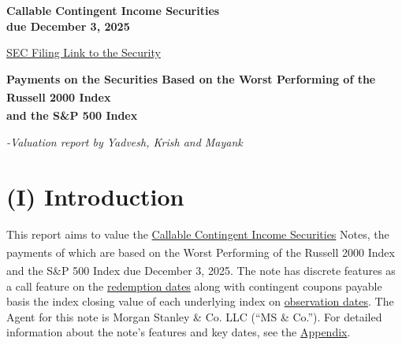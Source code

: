 \documentclass[12pt,a4paper]{article}
\begin{document}
\begin{center}
{\color{americanblue}\Large\textbf{Callable Contingent Income Securities \\ due December 3, 2025}}

\vspace{0.2cm}
{\color{americanblue}\large\href{https://sec.gov/Archives/edgar/data/1666268/000183988223032004/ms75\_424b2-16958.htm}{SEC Filing Link to the Security}}

\vspace{0.2cm}
{\color{americanblue}\Large\textbf{Payments on the Securities Based on the Worst Performing of the Russell 2000\textsuperscript{\textregistered} Index\\and the S\&P 500\textsuperscript{\textregistered} Index}}

\vspace{0.2cm}
{\small{\it -Valuation report by Yadvesh, Krish and Mayank}}
\end{center}

\vspace{1ex}

\section*{(I) Introduction}

This report aims to value the  \underline{Callable Contingent Income Securities} Notes, the payments of which are based on the Worst Performing of the Russell 2000\textsuperscript{\textregistered} Index and the S\&P 500\textsuperscript{\textregistered} Index due December 3, 2025. The note has discrete features as a call feature on the \hyperref[app:dates]{redemption dates} along with contingent coupons payable basis the index closing value of each underlying index on \hyperref[app:dates]{observation dates}. The Agent for this note is Morgan Stanley \& Co. LLC (“MS \& Co.”). For detailed information about the note's features and key dates, see the \hyperref[app:keydates]{Appendix}.

\vspace{0.5cm}
\end{document}
